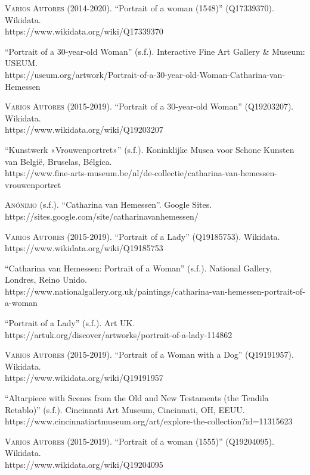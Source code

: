 \documentclass[12pt]{report}
\begin{document}
\textsc{Varios Autores} (2014-2020). ``Portrait of a woman (1548)'' (Q17339370). Wikidata.\\
https://www.wikidata.org/wiki/Q17339370\bigskip

``Portrait of a 30-year-old Woman'' (s.f.). Interactive Fine Art Gallery \& Museum: USEUM.\\
https://useum.org/artwork/Portrait-of-a-30-year-old-Woman-Catharina-van-Hemessen\bigskip

\textsc{Varios Autores} (2015-2019). ``Portrait of a 30-year-old Woman'' (Q19203207). Wikidata.\\
https://www.wikidata.org/wiki/Q19203207\bigskip

``Kunstwerk «Vrouwenportret»'' (s.f.). Koninklijke Musea voor Schone Kunsten van België, Bruselas, Bélgica.\\
https://www.fine-arts-museum.be/nl/de-collectie/catharina-van-hemessen-vrouwenportret\bigskip

\textsc{Anónimo} (s.f.). ``Catharina van Hemessen''. Google Sites.\\
https://sites.google.com/site/catharinavanhemessen/\bigskip

\textsc{Varios Autores} (2015-2019). ``Portrait of a Lady'' (Q19185753). Wikidata.\\
https://www.wikidata.org/wiki/Q19185753\bigskip

``Catharina van Hemessen: Portrait of a Woman'' (s.f.). National Gallery, Londres, Reino Unido.\\
https://www.nationalgallery.org.uk/paintings/catharina-van-hemessen-portrait-of-a-woman\bigskip

``Portrait of a Lady'' (s.f.). Art UK.\\
https://artuk.org/discover/artworks/portrait-of-a-lady-114862\bigskip

\textsc{Varios Autores} (2015-2019). ``Portrait of a Woman with a Dog'' (Q19191957). Wikidata.\\
https://www.wikidata.org/wiki/Q19191957\bigskip

``Altarpiece with Scenes from the Old and New Testaments (the Tendila Retablo)'' (s.f.). Cincinnati Art Museum, Cincinnati, OH, EEUU.\\
https://www.cincinnatiartmuseum.org/art/explore-the-collection?id=11315623\bigskip

\textsc{Varios Autores} (2015-2019). ``Portrait of a woman (1555)'' (Q19204095). Wikidata.\\
https://www.wikidata.org/wiki/Q19204095\bigskip
\end{document}

